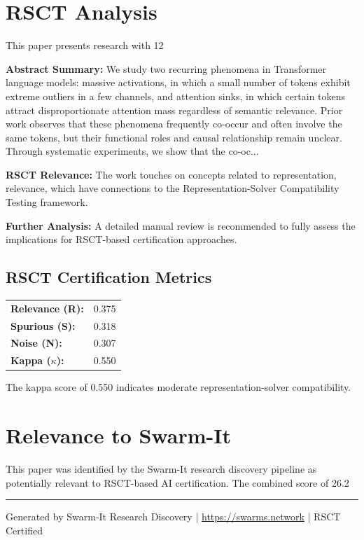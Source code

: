 \documentclass[11pt,a4paper]{article}
\begin{document}
\section{RSCT Analysis}
This paper presents research with 12%

\textbf{Abstract Summary:} We study two recurring phenomena in Transformer language models: massive activations, in which a small number of tokens exhibit extreme outliers in a few channels, and attention sinks, in which certain tokens attract disproportionate attention mass regardless of semantic relevance. Prior work observes that these phenomena frequently co-occur and often involve the same tokens, but their functional roles and causal relationship remain unclear. Through systematic experiments, we show that the co-oc...

\textbf{RSCT Relevance:} The work touches on concepts related to representation, relevance, which have connections to the Representation-Solver Compatibility Testing framework.

\textbf{Further Analysis:} A detailed manual review is recommended to fully assess the implications for RSCT-based certification approaches.


\subsection*{RSCT Certification Metrics}
\begin{tabular}{ll}
\textbf{Relevance (R):} & 0.375 \\
\textbf{Spurious (S):} & 0.318 \\
\textbf{Noise (N):} & 0.307 \\
\textbf{Kappa ($\kappa$):} & 0.550 \\
\end{tabular}

The kappa score of 0.550 indicates moderate representation-solver compatibility.


\section{Relevance to Swarm-It}
This paper was identified by the Swarm-It research discovery pipeline as potentially relevant to RSCT-based AI certification. The combined score of 26.2%

\vspace{1em}
\hrule
\vspace{0.5em}
\small{Generated by Swarm-It Research Discovery | \url{https://swarms.network} | RSCT Certified}
\end{document}
